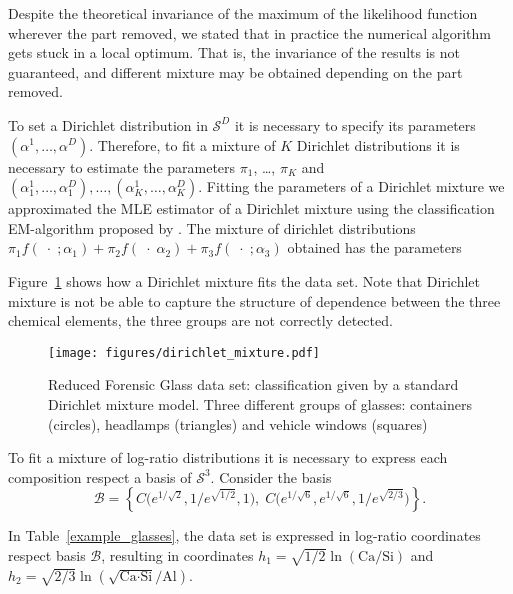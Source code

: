 \documentclass[12pt, a4paper]{article}
\begin{document}
Despite the theoretical invariance of the maximum of the likelihood function wherever the part removed, we stated that in practice the numerical algorithm gets stuck in a local optimum. That is, the invariance of the results is not guaranteed, and different mixture may be obtained depending on the part removed. 

To set a Dirichlet distribution in $\mathcal{S}^D$ it is necessary to specify its parameters $\left( \alpha^1, \dots ,\alpha^D \right)$. Therefore, to fit a mixture of $K$ Dirichlet distributions it is necessary to estimate the parameters $\pi_1$, \dots, $\pi_K$ and $\left( \alpha^1_1, \dots ,\alpha^D_1 \right), \dots, \left( \alpha^1_K, \dots, \alpha^D_K \right)$. Fitting the parameters of a Dirichlet mixture we approximated the MLE estimator of a Dirichlet mixture using the classification EM-algorithm proposed by \cite{celeux1992classification}. The mixture of dirichlet distributions $
\pi_1 f(\;\cdot\; ; \alpha_1) + \pi_2 f(\;\cdot\; \alpha_2) + \pi_3 f(\;\cdot\; ; \alpha_3)
$
obtained has the parameters

{\small  }



Figure~\ref{fig06fittingdirichlet} shows how a Dirichlet mixture fits the data set. Note that Dirichlet mixture is not be able to capture the structure of dependence between the three chemical elements, the three groups are not correctly detected. 

\begin{figure}[htbp]
\centering
\texttt{[image: figures/dirichlet\_mixture.pdf]}
\caption{Reduced Forensic Glass data set: classification given by a standard Dirichlet mixture model. Three different groups of glasses: containers (circles), headlamps (triangles) and vehicle windows (squares)}
\label{fig06fittingdirichlet}
\end{figure}

To fit a mixture of log-ratio distributions it is necessary to express each composition respect a basis of $\mathcal{S}^3$. Consider the basis 
\[
\mathcal{B} = \left\{ C\Big( e^{1/\sqrt{2}}, 1/e^{\sqrt{1/2}}, 1 \Big), \; C\Big( e^{1/\sqrt{6}}, e^{1/\sqrt{6}}, 1/e^{\sqrt{2/3}} \Big) \right\}.
\]

In Table~\ref{example_glasses}, the data set is expressed in log-ratio coordinates respect basis $\mathcal{B}$, resulting in coordinates $h_1 = \sqrt{1/2} \ln(\text{Ca}/\text{Si})$ and $h_2 = \sqrt{2/3} \ln(\sqrt{\text{Ca} \cdot \text{Si}} / \text{Al})$.
\end{document}
